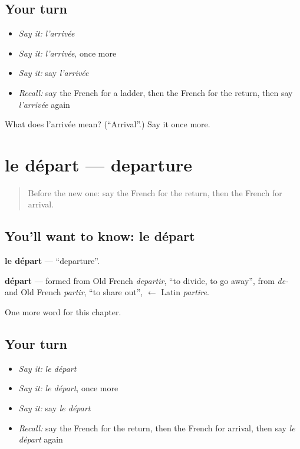 \subsection*{Your turn}
\begin{itemize}
\raggedright
  \item \emph{Say it:} \emph{l'arrivée}
  \item \emph{Say it:} \emph{l'arrivée}, once more
  \item \emph{Say it:} say \emph{l'arrivée}
  \item \emph{Recall:} say the French for a ladder, then the French for the return, then say \emph{l'arrivée} again
\end{itemize}

\begin{tcolorbox}[breakable,colback=teal!4,colframe=teal!35!black,title={Before you move on}]
What does l'arrivée mean? (\textquotedblleft{}Arrival\textquotedblright{}.) Say it once more.
\end{tcolorbox}
\section[le départ]{le départ — departure}

\label{lesson:FR-C231-depart}



\begin{quote}
Before the new one: say the French for the return, then the French for arrival.
\end{quote}

\subsection*{You'll want to know: le départ}
\textbf{le départ} — \textquotedblleft{}departure\textquotedblright{}.

\begin{cousinweb}
\textbf{départ} — formed from Old French \emph{departir}, \textquotedblleft{}to divide, to go away\textquotedblright{}, from \emph{de-} and Old French \emph{partir}, \textquotedblleft{}to share out\textquotedblright{}, $\leftarrow$ Latin \emph{partire}.
\end{cousinweb}

\begin{grammarlens}[title={What you've built}]
One more word for this chapter.
\end{grammarlens}

\subsection*{Your turn}
\begin{itemize}
\raggedright
  \item \emph{Say it:} \emph{le départ}
  \item \emph{Say it:} \emph{le départ}, once more
  \item \emph{Say it:} say \emph{le départ}
  \item \emph{Recall:} say the French for the return, then the French for arrival, then say \emph{le départ} again
\end{itemize}


